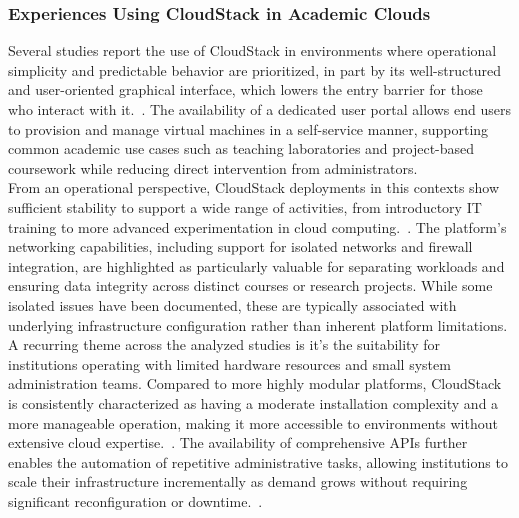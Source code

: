 \documentclass[sigplan]{acmart}
\begin{document}
        \subsubsection{Experiences Using CloudStack in Academic Clouds}
            Several studies report the use of CloudStack in environments where operational simplicity and predictable behavior are prioritized, in part by its well-structured and user-oriented graphical interface, which lowers the entry barrier for those who interact with it.~\cite{lynnComparativeStudyCurrent2015, oleksiukComparativeStudySupport2021}. The availability of a dedicated user portal allows end users to provision and manage virtual machines in a self-service manner, supporting common academic use cases such as teaching laboratories and project-based coursework while reducing direct intervention from administrators.\\
            
            From an operational perspective, CloudStack deployments in this contexts show sufficient stability to support a wide range of activities, from introductory IT training to more advanced experimentation in cloud computing.~\cite{oleksiukComparativeStudySupport2021, vijayakumarPrivateCloudInfrastructure2025}. The platform’s networking capabilities, including support for isolated networks and firewall integration, are highlighted as particularly valuable for separating workloads and ensuring data integrity across distinct courses or research projects. While some isolated issues have been documented, these are typically associated with underlying infrastructure configuration rather than inherent platform limitations.\\
            
            A recurring theme across the analyzed studies is it's the suitability for institutions operating with limited hardware resources and small system administration teams. Compared to more highly modular platforms, CloudStack is consistently characterized as having a moderate installation complexity and a more manageable operation, making it more accessible to environments without extensive cloud expertise.~\cite{vogelPrivateIaaSClouds2016, oleksiukExperienceMaintenanceAcademic2021}. The availability of comprehensive APIs further enables the automation of repetitive administrative tasks, allowing institutions to scale their infrastructure incrementally as demand grows without requiring significant reconfiguration or downtime.~\cite{vijayakumarPrivateCloudInfrastructure2025}.
        
\end{document}

